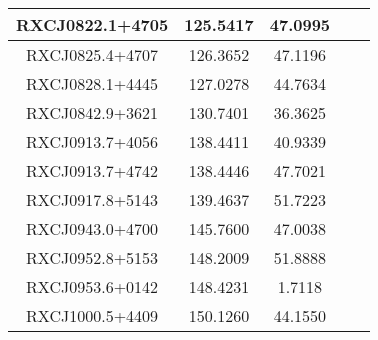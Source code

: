 \documentclass[12pt]{article}
\begin{document}
\begin{center}
\begin{tabular}{|c|c|c|c|c|}
RXCJ0822.1+4705 & 125.5417 & 47.0995 & &\\ \hline  %
RXCJ0825.4+4707 & 126.3652 & 47.1196 & &\\ \hline  %
RXCJ0828.1+4445 & 127.0278 & 44.7634 & &\\ \hline  %
RXCJ0842.9+3621 & 130.7401 & 36.3625 & &\\ \hline  %
RXCJ0913.7+4056 & 138.4411 & 40.9339 & &\\ \hline  %
RXCJ0913.7+4742 & 138.4446 & 47.7021 & &\\ \hline  %
RXCJ0917.8+5143 & 139.4637 & 51.7223 & &\\ \hline  %
RXCJ0943.0+4700 & 145.7600 & 47.0038 & &\\ \hline  %
RXCJ0952.8+5153 & 148.2009 & 51.8888 & &\\ \hline  %
RXCJ0953.6+0142 & 148.4231 & 1.7118  & &\\ \hline  %
RXCJ1000.5+4409 & 150.1260 & 44.1550 & &\\ \hline  %

\end{tabular}
\end{center}
\end{document}
